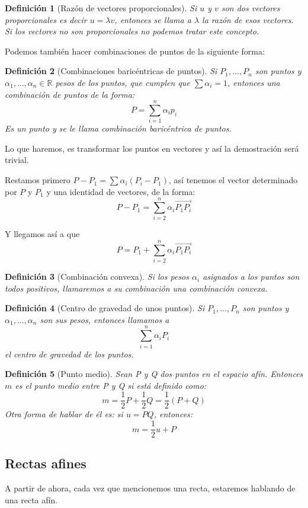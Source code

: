 \documentclass[11pt, a4paper, titlepage]{article}
\makeatletter
\renewenvironment{proof}[1][\proofname] {\vspace{-15pt}\par\pushQED{\qed}\normalfont\topsep6\p@\@plus6\p@\relax\trivlist\item[\hskip\labelsep\it#1\@addpunct{.}]\ignorespaces}{\popQED\endtrivlist\@endpefalse}
\newcommand{\R}{\mathbb{R}}
\theoremstyle{theorem-style}
\theoremstyle{definition-style}
\newtheorem*{ndef}{Definición}
\theoremstyle{remark-style}
\theoremstyle{example-style}
\makeatother
\begin{document}
\begin{ndef}[Razón de vectores proporcionales]
	Si $u$ y $v$ son dos vectores proporcionales es decir $u = \lambda v$, entonces se llama a $\lambda$ la razón de esos vectores.
	Si los vectores no son proporcionales no podemos tratar este concepto.
\end{ndef}
Podemos también hacer combinaciones de puntos de la siguiente forma:
\begin{ndef}[Combinaciones baricéntricas de puntos]
	Si $P_1,...,P_n$ son puntos y $\alpha_1,...,\alpha_n \in \R$ pesos de los puntos, que cumplen que $\sum \alpha_i = 1$, entonces una combinación de puntos de la forma:
	\[
	P = \sum_{i=1}^n \alpha_i p_i
	\]
	Es un punto y se le llama combinación baricéntrica de puntos.
\end{ndef}
\begin{proof}
	Lo que haremos, es transformar los puntos en vectores y así la demostración será trivial.
	
	Restamos primero $P-P_1 = \sum \alpha_i(P_i-P_1)$, así tenemos el vector determinado por $P$ y $P_1$ y una identidad de vectores, de la forma:
	\[
	P-P_1 = \sum_{i=2}^n \alpha_i \overrightarrow{P_1P_i}
	\]
	
	Y llegamos así a que
	\[
	P = P_1 + \sum_{i=2}^n \alpha_i \overrightarrow{P_1P_i}
	\]
\end{proof}

\begin{ndef}[Combinación convexa]
	Si los pesos $\alpha_i$ asignados a los puntos son todos positivos, llamaremos a su combinación una combinación convexa.
\end{ndef}

\begin{ndef}[Centro de gravedad de unos puntos]
	Si $P_1,...,P_n$ son puntos y $\alpha_1,...,\alpha_n$ son sus pesos, entonces llamamos a
	\[
	\sum_{i=1}^n \alpha_iP_i
	\]
	el centro de gravedad de los puntos.
\end{ndef}

\begin{ndef}[Punto medio]
Sean P y Q dos puntos en el espacio afín. Entonces $m$ es el punto medio entre P y Q si está definido como:
\[
m = \dfrac{1}{2} P + \dfrac{1}{2}Q = \dfrac{1}{2}(P+Q)
\]
Otra forma de hablar de él es: si $u = PQ$, entonces:
\[
m = \dfrac{1}{2}u + P
\]

\end{ndef}

\subsection{Rectas afines}
A partir de ahora, cada vez que mencionemos una recta, estaremos hablando de una recta afín.
\end{document}
